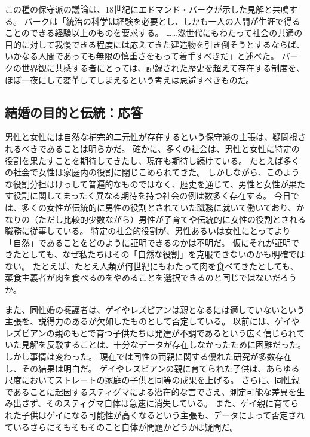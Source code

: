 \documentclass[paper=a4,book,openany]{jlreq} \usepackage{mystyle}
\begin{document}
この種の保守派の議論は、18世紀にエドマンド・バークが示した見解と共鳴する。
バークは「統治の科学は経験を必要とし、しかも一人の人間が生涯で得ることのできる経験以上のものを要求する。
……幾世代にもわたって社会の共通の目的に対して我慢できる程度には応えてきた建造物を引き倒そうとするならば、いかなる人間であっても無限の慎重さをもって着手すべきだ」と述べた\citep[p.53]{burke87:_reflec_revol_franc}。
バークの世界観に共感する者にとっては、記録された歴史を超えて存在する制度を、ほぼ一夜にして変革してしまえるという考えは忌避すべきものだ。

\subsection{結婚の目的と伝統：応答}

男性と女性には自然な補完的二元性が存在するという保守派の主張は、疑問視されるべきであることは明らかだ。
確かに、多くの社会は、男性と女性に特定の役割を果たすことを期待してきたし、現在も期待し続けている。
たとえば多くの社会で女性は家庭内の役割に閉じこめられてきた。
しかしながら、このような役割分担はけっして普遍的なものではなく、歴史を通じて、男性と女性が果たす役割に関してまったく異なる期待を持つ社会の例は数多く存在する。
今日では、多くの女性が伝統的に男性の役割とされていた職務に就いて働いており、かなりの（ただし比較的少数ながら）男性が子育てや伝統的に女性の役割とされる職務に従事している。
特定の社会的役割が、男性あるいは女性にとってより「自然」であることをどのように証明できるのかは不明だ。
仮にそれが証明できたとしても、なぜ私たちはその「自然な役割」を克服できないのかも明確ではない。
たとえば、たとえ人類が何世紀にもわたって肉を食べてきたとしても、菜食主義者が肉を食べるのをやめることを選択できるのと同じではないだろうか。

また、同性婚の擁護者は、ゲイやレズビアンは親となるには適していないという主張を、説得力のあるが欠如したものとして否定している。
以前には、ゲイやレズビアンの親のもとで育つ子供たちは発達が不調であるという広く信じられていた見解を反駁することは、十分なデータが存在しなかったために困難だった。
しかし事情は変わった。
現在では同性の両親に関する優れた研究が多数存在し、その結果は明白だ。
ゲイやレズビアンの親に育てられた子供は、あらゆる尺度においてストレートの家庭の子供と同等の成果を上げる。
さらに、同性親であることに起因するスティグマによる潜在的な害でさえ、測定可能な差異を生み出さず、そのスティグマ自体は急速に消失している\citep{calzo17:_paren_sexual_orien_child_psych_well_being,biblarz10:_how_does_gender_paren_matter}。
また、ゲイ親に育てられた子供はゲイになる可能性が高くなるという主張も、データによって否定されている{\DDASH}さらにそもそもそのこと自体が問題かどうかは疑問だ。
\end{document}
